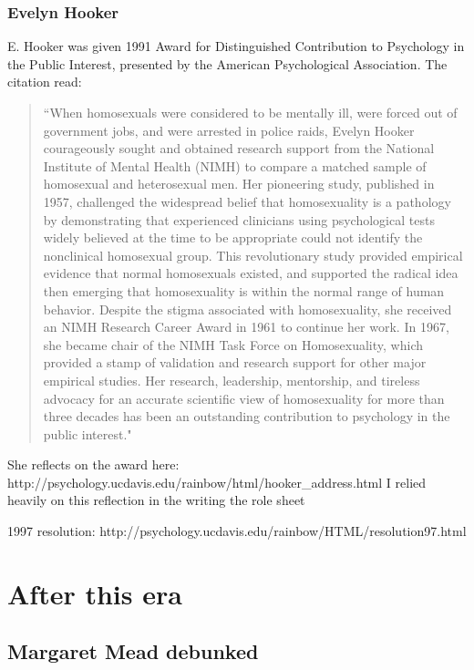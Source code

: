 \begin{refsection}
\subsubsection{Evelyn Hooker}
\label{evelynhooker}

E. Hooker was given 1991 Award for Distinguished Contribution to Psychology in the Public Interest, presented by the American Psychological Association. The citation read:

\begin{quote}

“When homosexuals were considered to be mentally ill, were forced out of government jobs, and were arrested in police raids, Evelyn Hooker courageously sought and obtained research support from the National Institute of Mental Health (NIMH) to compare a matched sample of homosexual and heterosexual men. Her pioneering study, published in 1957, challenged the widespread belief that homosexuality is a pathology by demonstrating that experienced clinicians using psychological tests widely believed at the time to be appropriate could not identify the nonclinical homosexual group. This revolutionary study provided empirical evidence that normal homosexuals existed, and supported the radical idea then emerging that homosexuality is within the normal range of human behavior. Despite the stigma associated with homosexuality, she received an NIMH Research Career Award in 1961 to continue her work. In 1967, she became chair of the NIMH Task Force on Homosexuality, which provided a stamp of validation and research support for other major empirical studies. Her research, leadership, mentorship, and tireless advocacy for an accurate scientific view of homosexuality for more than three decades has been an outstanding contribution to psychology in the public interest."
\end{quote}

She reflects on the award here: http:\slash \slash psychology.ucdavis.edu\slash rainbow\slash html\slash hooker\_address.html I relied heavily on this reflection in the writing the role sheet

1997 resolution: http:\slash \slash psychology.ucdavis.edu\slash rainbow\slash HTML\slash resolution97.html

\section{After this era}
\label{afterthisera}

\subsection{Margaret Mead debunked}
\label{margaretmeaddebunked}


\end{refsection}
